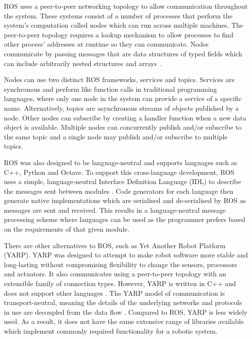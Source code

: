 ROS uses a peer-to-peer networking topology to allow communication
throughout the system. These systems consist of a number of processes
that perform the system's computation called nodes which can
run across multiple machines. The peer-to-peer topology requires
a lookup mechanism to allow processes to find other process' addresses at
runtime so they can communicate. Nodes communicate by passing messages
that are data structures of typed fields which can include arbitrarily nested
structures and arrays~\cite{crick2017rosbridge}.


Nodes can use two distinct ROS frameworks, services and topics.
Services are synchronous and perform like function
calls in traditional programming languages, where only one node in the
system can provide a service of a specific name. Alternatively, topics are
asynchronous streams of objects published by a node. Other nodes can
subscribe by creating a handler function when a new data object is available.
Multiple nodes can concurrently publish and/or subscribe to the same topic and
a single node may publish and/or subscribe to multiple topics.

ROS was also designed to be language-neutral and supports languages
such as C++, Python and Octave. To support this cross-language
development, ROS uses a simple, language-neutral Interface Definition
Language (IDL) to describe the messages sent between modules
\cite{quigley2009ros}. Code generators for each language then generate
native implementations which are serialised and de-serialised by ROS
as messages are sent and received. This results in a language-neutral
message processing scheme where languages can be used as the programmer
prefers based on the requirements of that given module.

There are other alternatives to ROS, such as Yet Another Robot Platform
(YARP). YARP was designed to attempt to make robot software more stable
and long-lasting without compromising flexibility to change the sensors,
processors and actuators. It also communicates using a peer-to-peer
topology with an extensible family of connection types. However, YARP is
written in C++ and does not support other languages \cite{aboutYARP}.
The YARP model of communication is transport-neutral, meaning the details
of the underlying networks and protocols in use are decoupled from the
data flow \cite{exactlyIsYARP}. Compared to ROS, YARP is less widely used.
As a result, it does not have the same extensive range of libraries available
which implement commonly required functionality for a robotic system.

